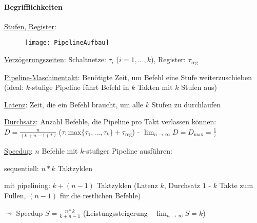 \paragraph{Begrifflichkeiten}
\begin{items}
  \item \underline{Stufen, Register}:
  \begin{figure}[H]
    \centering
    \label{PipelineAufbau}
    \texttt{[image: PipelineAufbau]}
  \end{figure}

  \item \underline{Verzögerungszeiten}: Schaltnetze: $\tau_i$ ($i=1,\dots,k$), Register: $\tau_{\text{reg}}$

  \item \underline{Pipeline-Maschinentakt}: Benötigte Zeit, um Befehl eine Stufe weiterzuschieben (ideal: $k$-stufige Pipeline führt Befehl in $k$ Takten mit $k$ Stufen aus)
  \item \underline{Latenz}: Zeit, die ein Befehl braucht, um alle $k$ Stufen zu durchlaufen
  \item \underline{Durchsatz}: Anzahl Befehle, die Pipeline pro Takt verlassen können: $D=\tfrac{n}{(k+n-1)*\tau}$ ($\tau: \text{max}\{ \tau_1,\dots,\tau_k \} + \tau_\text{reg}$) - $\lim_{n \to \infty} D = D_\text{max} = \tfrac{1}{\tau}$
  \item \underline{Speedup}: $n$ Befehle mit $k$-stufiger Pipeline ausführen:
  \begin{enumeration}
    \item sequentiell: $n*k$ Taktzyklen
    \item mit pipelining: $k+(n-1)$ Taktzyklen (Latenz $k$, Durchsatz $1$ - $k$ Takte zum Füllen, $(n-1)$ für die restlichen Befehle)
  \end{enumeration}
  $\leadsto$ Speedup $S=\tfrac{n*k}{k+n-1}$ (Leistungssteigerung - $\lim_{n \to \infty}S=k$)
\end{items}

\newpage

